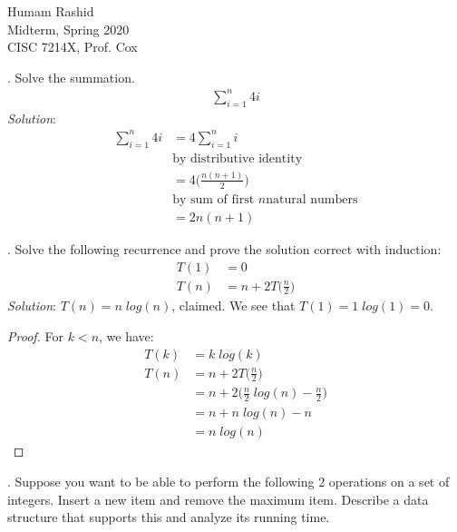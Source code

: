 \documentclass{scrartcl}
\begin{document}
\begin{flushleft}
    Humam Rashid\\
    Midterm, Spring 2020\\
    CISC 7214X, Prof. Cox
\end{flushleft}
    \bigskip
    
    . Solve the summation.
    \begin{align*}
        \sum_{i=1}^{n} 4i
    \end{align*}
    \textit{Solution}:
    \begin{align*}
        \sum_{i=1}^{n} 4i &= 4 \sum_{i=1}^{n} i\\[6pt]&\text{by distributive identity}\\[6pt]
                          &= 4 \bigg(\frac{n (n + 1)}{2}\bigg)\\[6pt]&\text{by sum of first $n$
                          natural numbers}\\[6pt]
                          &= 2n(n + 1)
    \end{align*}

    \bigskip
    . Solve the following recurrence and prove the solution correct with induction:
    \begin{align*}
        T(1) &= 0\\
        T(n) &= n + 2 T\bigg(\frac{n}{2}\bigg)
    \end{align*}
    \textit{Solution}: $T(n) = n\;log(n)$, claimed. We see that $T(1) = 1\;log(1) = 0$.\\
    \begin{proof}
        For $k < n$, we have:
        \begin{align*}
            T(k) &= k\;log(k)\\
            T(n) &= n + 2 T\bigg(\frac{n}{2}\bigg)\\
                 &= n + 2 \bigg(\frac{n}{2}\;log(n) - \frac{n}{2}\bigg)\\
                 &= n + n\;log(n) - n\\
                 &= n\;log(n)
        \end{align*}
    \end{proof}
    \newpage
    . Suppose you want to be able to perform the following 2 operations on a set of integers.
    Insert a new item and remove the maximum item. Describe a data structure that supports this and
    analyze its running time.\\
\end{document}
